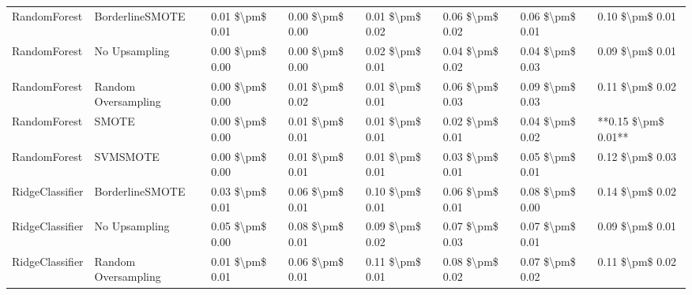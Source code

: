 \begin{tabular}{llllllll}
                   RandomForest &               BorderlineSMOTE & 0.01 \$\textbackslash pm\$ 0.01 &           0.00 \$\textbackslash pm\$ 0.00 &       0.01 \$\textbackslash pm\$ 0.02 &        0.06 \$\textbackslash pm\$ 0.02 &                         0.06 \$\textbackslash pm\$ 0.01 &     0.10 \$\textbackslash pm\$ 0.01 \\
                   RandomForest &                 No Upsampling & 0.00 \$\textbackslash pm\$ 0.00 &           0.00 \$\textbackslash pm\$ 0.00 &       0.02 \$\textbackslash pm\$ 0.01 &        0.04 \$\textbackslash pm\$ 0.02 &                         0.04 \$\textbackslash pm\$ 0.03 &     0.09 \$\textbackslash pm\$ 0.01 \\
                   RandomForest &           Random Oversampling & 0.00 \$\textbackslash pm\$ 0.00 &           0.01 \$\textbackslash pm\$ 0.02 &       0.01 \$\textbackslash pm\$ 0.01 &        0.06 \$\textbackslash pm\$ 0.03 &                         0.09 \$\textbackslash pm\$ 0.03 &     0.11 \$\textbackslash pm\$ 0.02 \\
                   RandomForest &                         SMOTE & 0.00 \$\textbackslash pm\$ 0.00 &           0.01 \$\textbackslash pm\$ 0.01 &       0.01 \$\textbackslash pm\$ 0.01 &        0.02 \$\textbackslash pm\$ 0.01 &                         0.04 \$\textbackslash pm\$ 0.02 & **0.15 \$\textbackslash pm\$ 0.01** \\
                   RandomForest &                      SVMSMOTE & 0.00 \$\textbackslash pm\$ 0.00 &           0.01 \$\textbackslash pm\$ 0.01 &       0.01 \$\textbackslash pm\$ 0.01 &        0.03 \$\textbackslash pm\$ 0.01 &                         0.05 \$\textbackslash pm\$ 0.01 &     0.12 \$\textbackslash pm\$ 0.03 \\
                RidgeClassifier &               BorderlineSMOTE & 0.03 \$\textbackslash pm\$ 0.01 &           0.06 \$\textbackslash pm\$ 0.01 &       0.10 \$\textbackslash pm\$ 0.01 &        0.06 \$\textbackslash pm\$ 0.01 &                         0.08 \$\textbackslash pm\$ 0.00 &     0.14 \$\textbackslash pm\$ 0.02 \\
                RidgeClassifier &                 No Upsampling & 0.05 \$\textbackslash pm\$ 0.00 &           0.08 \$\textbackslash pm\$ 0.01 &       0.09 \$\textbackslash pm\$ 0.02 &        0.07 \$\textbackslash pm\$ 0.03 &                         0.07 \$\textbackslash pm\$ 0.01 &     0.09 \$\textbackslash pm\$ 0.01 \\
                RidgeClassifier &           Random Oversampling & 0.01 \$\textbackslash pm\$ 0.01 &           0.06 \$\textbackslash pm\$ 0.01 &       0.11 \$\textbackslash pm\$ 0.01 &        0.08 \$\textbackslash pm\$ 0.02 &                         0.07 \$\textbackslash pm\$ 0.02 &     0.11 \$\textbackslash pm\$ 0.02 \\

\end{tabular}
